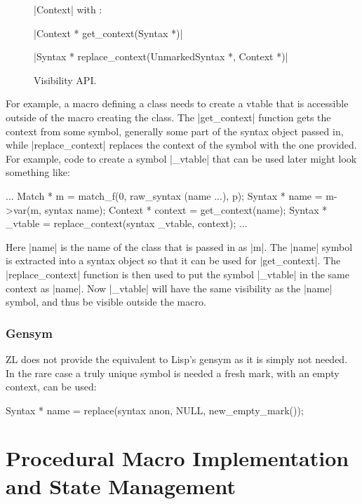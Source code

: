 \begin{figure}
\begin{apil}
\item {} |Context| with :
\begin{apill}
\item |Context * get_context(Syntax *)|
\item |Syntax * replace_context(UnmarkedSyntax *, Context *)|
\end{apill}
\end{apil}
\caption{Visibility API.}
\label{visibility-api}
\end{figure}
For example, a macro defining a class needs to
create a vtable that is accessible outside of the macro creating the
class.  The |get_context| function gets the context from some symbol,
generally some part of the syntax object passed in, while
|replace_context| replaces the context of the symbol with the one
provided.  For example, code to create a symbol |_vtable| that can be
used later might look something like:
\begin{code}
...
Match * m = match_f(0, raw_syntax (name ...), p);
Syntax * name = m->var(m, syntax name);
Context * context = get_context(name);
Syntax * _vtable = replace_context(syntax _vtable, context);
...
\end{code}
Here |name| is the name of the class that is passed in as |m|.  The
|name| symbol is extracted into a syntax object so that it can be used
for |get_context|.  The |replace_context| function is then used to put
the symbol |_vtable| in the same context as |name|.  Now |_vtable|
will have the same visibility as the |name| symbol, and thus be
visible outside the macro.

\subsection{Gensym}

ZL does not provide the equivalent to Lisp's gensym as it is simply
not needed.  In the rare case a truly unique symbol is needed a fresh
mark, with an empty context, can be used:
\begin{code}
Syntax * name = replace(syntax anon, NULL, new_empty_mark());
\end{code}

\chapter{Procedural Macro Implementation and State Management}

